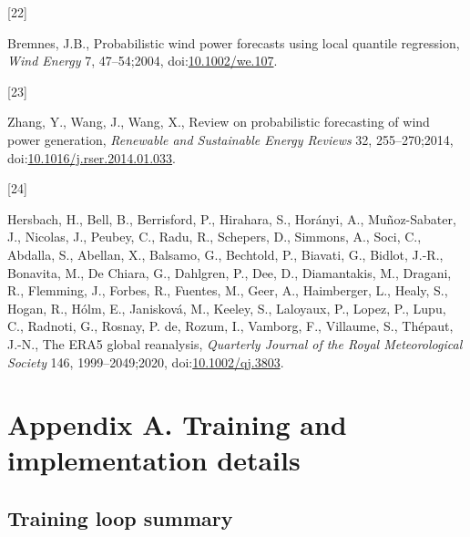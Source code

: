 \documentclass[
  11pt]{article}
\newlength{\cslhangindent}
\newlength{\csllabelwidth}
\newenvironment{CSLReferences}[2] %
 {\begin{list}{}{%
  \setlength{\itemindent}{0pt}
  \setlength{\leftmargin}{0pt}
  \setlength{\parsep}{0pt}
  \ifodd #1
   \setlength{\leftmargin}{\cslhangindent}
   \setlength{\itemindent}{-1\cslhangindent}
  \fi
  \setlength{\itemsep}{#2\baselineskip}}}
 {\end{list}}
\newcommand{\CSLLeftMargin}[1]{\parbox[t]{\csllabelwidth}{\strut#1\strut}}
\newcommand{\CSLRightInline}[1]{\parbox[t]{\linewidth - \csllabelwidth}{\strut#1\strut}}
\begin{document}
\begin{CSLReferences}{0}{0}
\CSLLeftMargin{{[}22{]} }%
\CSLRightInline{Bremnes, J.B., Probabilistic wind power forecasts using
local quantile regression, \emph{Wind Energy} 7, 47--54;2004,
doi:\href{https://doi.org/10.1002/we.107}{10.1002/we.107}.}

\CSLLeftMargin{{[}23{]} }%
\CSLRightInline{Zhang, Y., Wang, J., Wang, X., Review on probabilistic
forecasting of wind power generation, \emph{Renewable and Sustainable
Energy Reviews} 32, 255--270;2014,
doi:\href{https://doi.org/10.1016/j.rser.2014.01.033}{10.1016/j.rser.2014.01.033}.}

\CSLLeftMargin{{[}24{]} }%
\CSLRightInline{Hersbach, H., Bell, B., Berrisford, P., Hirahara, S.,
Horányi, A., Muñoz-Sabater, J., Nicolas, J., Peubey, C., Radu, R.,
Schepers, D., Simmons, A., Soci, C., Abdalla, S., Abellan, X., Balsamo,
G., Bechtold, P., Biavati, G., Bidlot, J.-R., Bonavita, M., De Chiara,
G., Dahlgren, P., Dee, D., Diamantakis, M., Dragani, R., Flemming, J.,
Forbes, R., Fuentes, M., Geer, A., Haimberger, L., Healy, S., Hogan, R.,
Hólm, E., Janisková, M., Keeley, S., Laloyaux, P., Lopez, P., Lupu, C.,
Radnoti, G., Rosnay, P. de, Rozum, I., Vamborg, F., Villaume, S.,
Thépaut, J.-N., The {ERA5} global reanalysis, \emph{Quarterly Journal of
the Royal Meteorological Society} 146, 1999--2049;2020,
doi:\href{https://doi.org/10.1002/qj.3803}{10.1002/qj.3803}.}

\end{CSLReferences}

\clearpage

\section*{Appendix A. Training and implementation
details}\label{appendix-a.-training-and-implementation-details}

\subsection*{Training loop summary}\label{training-loop-summary}
\end{document}
